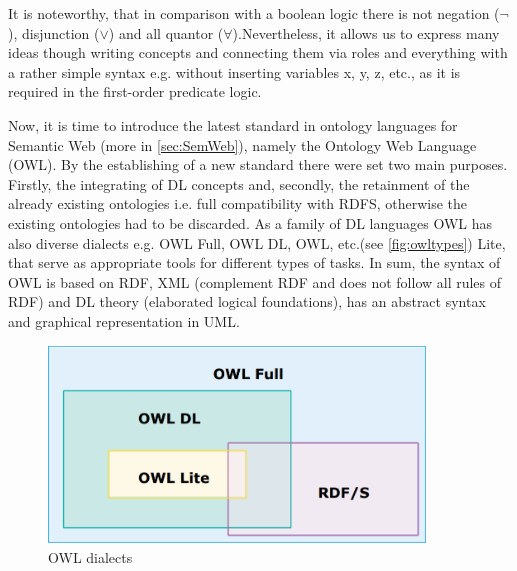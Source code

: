 		It is noteworthy, that in comparison with a boolean logic there is not negation ($\lnot$), disjunction ($\lor$) and all quantor ($\forall$).Nevertheless, it allows us to express many ideas though writing concepts and connecting them via roles and everything with a rather simple syntax e.g. without inserting variables x, y, z, etc., as it is required in the first-order predicate logic.
		
		Now, it is time to introduce the latest standard in ontology languages for Semantic Web (more in \autoref{sec:SemWeb}), namely the Ontology Web Language (OWL)\cite{owl04}. By the establishing of a new standard there were set two main purposes. Firstly, the integrating of DL concepts and, secondly, the retainment of the already existing ontologies i.e. full compatibility with RDFS, otherwise the existing ontologies had to be discarded. As a family of DL languages OWL has also diverse dialects e.g. OWL Full, OWL DL, OWL, etc.(see \autoref{fig:owltypes}) Lite,  that serve as appropriate tools for different types of tasks. In sum, the syntax of OWL is based on RDF, XML (complement RDF and does not follow all rules of RDF) and DL theory (elaborated logical foundations), has an abstract syntax and graphical representation in UML.      	
		\begin{figure}
			\centering
			\includegraphics[width=10cm]{images/owltypes.PNG}
			\caption{OWL dialects \cite[lecture 8, slide 40]{Kon10}}
			\label{fig:owltypes}
		\end{figure}             
		
